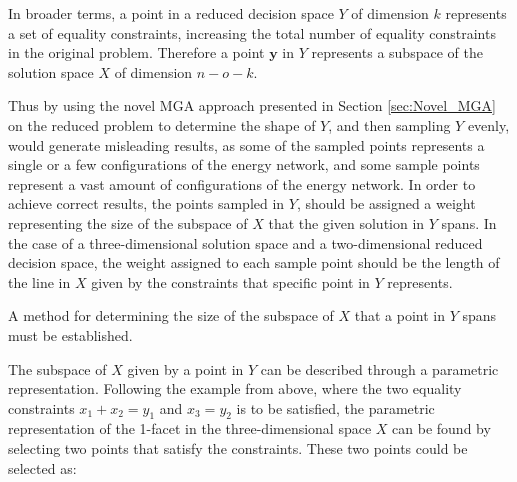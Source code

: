 In broader terms, a point in a reduced decision space $Y$ of dimension $k$ represents a set of equality constraints, increasing the total number of equality constraints in the original problem. Therefore a point $\mathbf{y}$ in $Y$ represents a subspace of the solution space $X$ of dimension $n-o-k$. 






Thus by using the novel MGA approach presented in Section \ref{sec:Novel_MGA} on the reduced problem to determine the shape of $Y$, and then sampling $Y$ evenly, would generate misleading results, as some of the sampled points represents a single or a few configurations of the energy network, and some sample points represent a vast amount of configurations of the energy network. In order to achieve correct results, the points sampled in $Y$, should be assigned a weight representing the size of the subspace of $X$ that the given solution in $Y$ spans. In the case of a three-dimensional solution space and a two-dimensional reduced decision space, the weight assigned to each sample point should be the length of the line in $X$ given by the constraints that specific point in $Y$ represents. 

A method for determining the size of the subspace of $X$ that a point in $Y$ spans must be established. 

The subspace of $X$ given by a point in $Y$ can be described through a parametric representation. Following the example from above, where the two equality constraints  $ x_1 + x_2 = y_1$ and $x_3 = y_2 $ is to be satisfied, the parametric representation of the 1-facet in the three-dimensional space $X$ can be found by selecting two points that satisfy the constraints. These two points could be selected as: 

